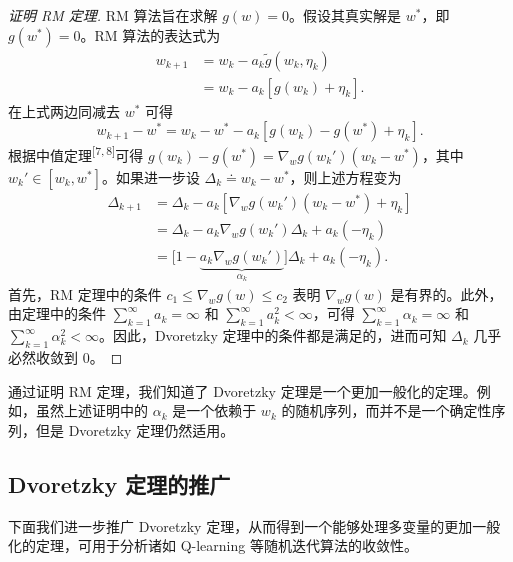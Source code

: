 \begin{proof}[证明 RM 定理]
RM 算法旨在求解 $g(w) = 0$。假设其真实解是 $w^*$，即 $g(w^*) = 0$。RM 算法的表达式为
\begin{equation}
\begin{aligned}
w_{k+1} &= w_k - a_k \tilde{g}(w_k, \eta_k) \\
&= w_k - a_k [ g(w_k) + \eta_k ].
\end{aligned}
\end{equation}
在上式两边同减去 $w^*$ 可得
\begin{equation}
w_{k+1} - w^* = w_k - w^* - a_k \left[ g(w_k) - g(w^*) + \eta_k \right].
\end{equation}
根据中值定理\textsuperscript{[7,\,8]}可得 $g(w_k) - g(w^*) = \nabla_w g(w_k') (w_k - w^*)$，其中 $w_k' \in [w_k, w^*]$。如果进一步设 $\Delta_k \doteq w_k - w^*$，则上述方程变为
\begin{equation}
\begin{aligned}
\Delta_{k+1} &= \Delta_k - a_k [ \nabla_w g(w_k') (w_k - w^*) + \eta_k ] \\
&= \Delta_k - a_k \nabla_w g(w_k') \Delta_k + a_k (-\eta_k) \\
&= \big[ 1 - \underbrace{a_k \nabla_w g(w_k')}_{\alpha_k} \big] \Delta_k + a_k (-\eta_k).
\end{aligned}
\end{equation}
首先，RM 定理中的条件 $c_1 \leqslant \nabla_w g(w) \leqslant c_2$ 表明 $\nabla_w g(w)$ 是有界的。此外，由定理中的条件 $\sum_{k=1}^{\infty} a_k = \infty$ 和 $\sum_{k=1}^{\infty} a_k^2 < \infty$，可得 $\sum_{k=1}^{\infty} \alpha_k = \infty$ 和 $\sum_{k=1}^{\infty} \alpha_k^2 < \infty$。因此，Dvoretzky 定理中的条件都是满足的，进而可知 $\Delta_k$ 几乎必然收敛到 0。
\end{proof}

通过证明 RM 定理，我们知道了 Dvoretzky 定理是一个更加一般化的定理。例如，虽然上述证明中的 $\alpha_k$ 是一个依赖于 $w_k$ 的随机序列，而并不是一个确定性序列，但是 Dvoretzky 定理仍然适用。

\subsection{Dvoretzky 定理的推广}
\label{sec:rl-sa-dvor-ext}

下面我们进一步推广 Dvoretzky 定理，从而得到一个能够处理多变量的更加一般化的定理，可用于分析诸如 Q-learning 等随机迭代算法的收敛性。

